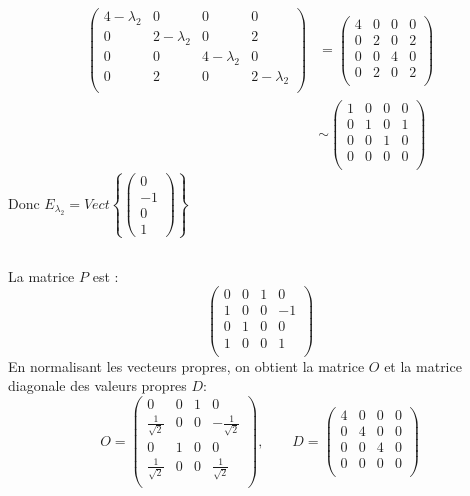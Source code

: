 \[\begin{split}
\left(
\begin{array}{cccc}
4-\lambda _2 & 0 & 0 & 0 \\
0 & 2-\lambda _2 & 0 & 2 \\
0 & 0 & 4-\lambda _2 & 0 \\
0 & 2 & 0 & 2-\lambda _2 \\
\end{array}
\right)&=\left(
\begin{array}{cccc}
4 & 0 & 0 & 0 \\
0 & 2 & 0 & 2 \\
0 & 0 & 4 & 0 \\
0 & 2 & 0 & 2 \\
\end{array}
\right)\\
&\sim\left(
\begin{array}{cccc}
1 & 0 & 0 & 0 \\
0 & 1 & 0 & 1 \\
0 & 0 & 1 & 0 \\
0 & 0 & 0 & 0 \\
\end{array}
\right)
\end{split}\]
Donc $E_{\lambda_2}=Vect\left\{\begin{pmatrix}
0\\-1\\0\\1
\end{pmatrix}\right\}$
\subsection{}
La matrice $P$ est :
\[\left(
\begin{array}{cccc}
0 & 0 & 1 & 0 \\
1 & 0 & 0 & -1 \\
0 & 1 & 0 & 0 \\
1 & 0 & 0 & 1 \\
\end{array}
\right)\]
En normalisant les vecteurs propres, on obtient la matrice $O$ et la matrice diagonale des valeurs propres $D$:
\[O=\left(
\begin{array}{cccc}
0 & 0 & 1 & 0 \\
\frac{1}{\sqrt{2}} & 0 & 0 & -\frac{1}{\sqrt{2}} \\
0 & 1 & 0 & 0 \\
\frac{1}{\sqrt{2}} & 0 & 0 & \frac{1}{\sqrt{2}} \\
\end{array}
\right),\qquad D=\left(
\begin{array}{cccc}
4 & 0 & 0 & 0 \\
0 & 4 & 0 & 0 \\
0 & 0 & 4 & 0 \\
0 & 0 & 0 & 0 \\
\end{array}
\right)\]
\subsection{}

